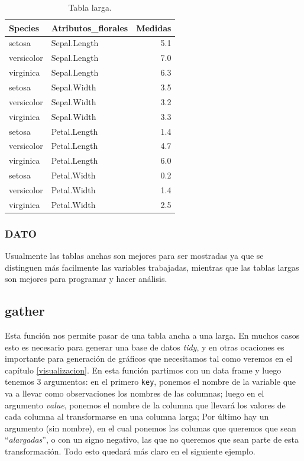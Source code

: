 \documentclass[]{book}
\begin{document}
\begin{table}

\caption{\label{tab:TablaLarga}Tabla larga.}
\centering
\begin{tabular}[t]{llr}
\toprule
Species & Atributos\_florales & Medidas\\
\midrule
setosa & Sepal.Length & 5.1\\
versicolor & Sepal.Length & 7.0\\
virginica & Sepal.Length & 6.3\\
setosa & Sepal.Width & 3.5\\
versicolor & Sepal.Width & 3.2\\
\addlinespace
virginica & Sepal.Width & 3.3\\
setosa & Petal.Length & 1.4\\
versicolor & Petal.Length & 4.7\\
virginica & Petal.Length & 6.0\\
setosa & Petal.Width & 0.2\\
\addlinespace
versicolor & Petal.Width & 1.4\\
virginica & Petal.Width & 2.5\\
\bottomrule
\end{tabular}
\end{table}

\hypertarget{dato}{%
\subsubsection{DATO}\label{dato}}

Usualmente las tablas anchas son mejores para ser mostradas ya que se
distinguen más facilmente las variables trabajadas, mientras que las
tablas largas son mejores para programar y hacer análisis.

\hypertarget{gather}{%
\subsection{gather}\label{gather}}

Esta función nos permite pasar de una tabla ancha a una larga. En muchos
casos esto es necesario para generar una base de datos \emph{tidy}, y en
otras ocaciones es importante para generación de gráficos que
necesitamos tal como veremos en el capítulo \ref{visualizacion}. En esta
función partimos con un data frame y luego tenemos 3 argumentos: en el
primero \texttt{key}, ponemos el nombre de la variable que va a llevar
como observaciones los nombres de las columnas; luego en el argumento
\emph{value}, ponemos el nombre de la columna que llevará los valores de
cada columna al transformarse en una columna larga; Por último hay un
argumento (sin nombre), en el cual ponemos las columas que queremos que
sean ``\emph{alargadas}'', o con un signo negativo, las que no queremos
que sean parte de esta transformación. Todo esto quedará más claro en el
siguiente ejemplo.
\end{document}
